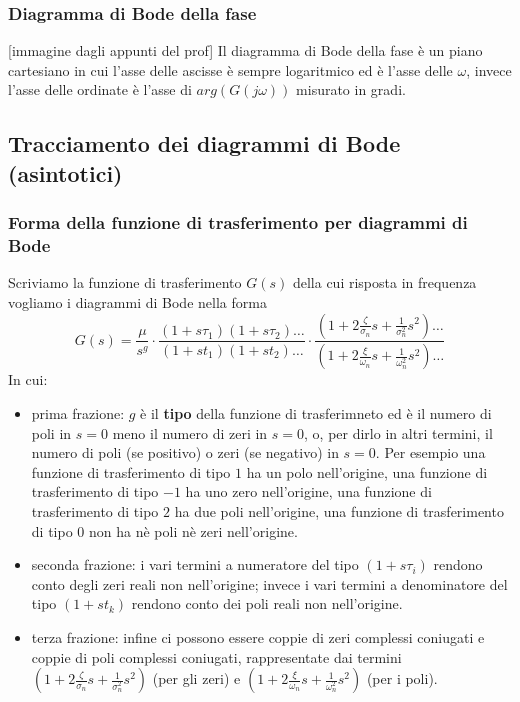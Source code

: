 \subsubsection{Diagramma di Bode della fase}
[immagine dagli appunti del prof]\newline
\newline
Il diagramma di Bode della fase è un piano cartesiano in cui l'asse delle ascisse è sempre logaritmico ed è l'asse delle $\omega$, invece l'asse delle ordinate è l'asse di $arg(G(j \omega))$ misurato in gradi.
\subsection{Tracciamento dei diagrammi di Bode (asintotici)}
\subsubsection{Forma della funzione di trasferimento per diagrammi di Bode}
Scriviamo la funzione di trasferimento $G(s)$ della cui risposta in frequenza vogliamo i diagrammi di Bode nella forma 
\[
    G(s) = \frac{\mu}{s^g} \cdot \frac{(1 + s \tau_1)(1 + s \tau_2)\dots}{(1 + s t_1)(1 + s t_2)\dots} \cdot \frac{(1 + 2 \frac{\zeta}{\sigma_n}s + \frac{1}{\sigma_n^2}s^2)\dots}{(1 + 2 \frac{\xi}{\omega_n} s + \frac{1}{\omega_n^2}s^2)\dots}
\]
In cui:
\begin{itemize}
    \item prima frazione: $g$ è il \textbf{tipo} della funzione di trasferimneto ed è il numero di poli in $s=0$ meno il numero di zeri in $s=0$, o, per dirlo in altri termini, il numero di poli (se positivo) o zeri (se negativo) in $s=0$.\newline
    Per esempio una funzione di trasferimento di tipo $1$ ha un polo nell'origine, una funzione di trasferimento di tipo $-1$ ha uno zero nell'origine, una funzione di trasferimento di tipo $2$ ha due poli nell'origine, una funzione di trasferimento di tipo $0$ non ha nè poli nè zeri nell'origine.
    \item seconda frazione: i vari termini a numeratore del tipo $(1 + s \tau_i)$ rendono conto degli zeri reali non nell'origine; invece i vari termini a denominatore del tipo $(1 + s t_k)$ rendono conto dei poli reali non nell'origine.
    \item terza frazione: infine ci possono essere coppie di zeri complessi coniugati e coppie di poli complessi coniugati, rappresentate dai termini $(1 + 2 \frac{\zeta}{\sigma_n}s + \frac{1}{\sigma_n^2}s^2)$ (per gli zeri) e $(1 + 2 \frac{\xi}{\omega_n} s + \frac{1}{\omega_n^2}s^2)$ (per i poli).
\end{itemize}
